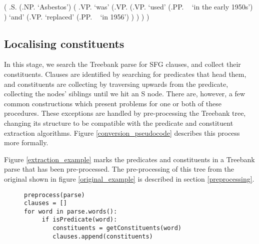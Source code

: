 \documentclass[11pt]{article}
\begin{document}



\begin{figure*}
\begin{parsetree}
    ( .S. 
        (.NP.  `Asbestos')
        ( .VP.
			`was'
			(.VP.
				(.VP.
					`used'
					(.PP. ~ `in the early 1950s')
				)
				`and'
				(.VP.
					`replaced'
					(.PP. ~ `in 1956')
				)
			)
		)	
    )
\end{parsetree}
\end{figure*}

\subsection{Localising constituents}

In this stage, we search the Treebank parse for SFG clauses, and collect their constituents. Clauses are identified by searching for predicates that head them, and constituents are collecting by traversing upwards from the predicate, collecting the nodes' siblings until we hit an S node. There are, however, a few common constructions which present problems for one or both of these procedures. These exceptions are handled by pre-processing the Treebank tree, changing its structure to be compatible with the predicate and constituent extraction algorithms. Figure \ref{conversion_pseudocode} describes this process more formally.

Figure \ref{extraction_example} marks the predicates and constituents in a Treebank parse that has been pre-processed. The pre-processing of this tree from the original shown in figure \ref{original_example} is described in section \ref{preprocessing}.

\begin{figure}
\begin{verbatim}
preprocess(parse)
clauses = []
for word in parse.words():
	 if isPredicate(word):
		constituents = getConstituents(word)
		clauses.append(constituents)
\end{verbatim}
\end{figure}
\end{document}
